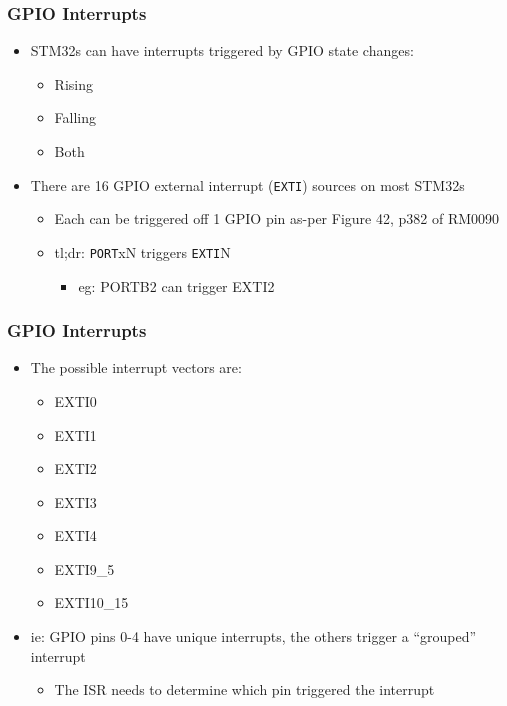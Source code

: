 \documentclass[14pt]{beamer}
\begin{document}
\begin{frame}[fragile]
\frametitle{GPIO Interrupts}
\begin{itemize}
\item STM32s can have interrupts triggered by GPIO state changes:
	\begin{itemize}
		\item Rising
		\item Falling
		\item Both
	\end{itemize}
\item There are 16 GPIO external interrupt (\texttt{EXTI}) sources on most STM32s
	\begin{itemize}
		\item Each can be triggered off 1 GPIO pin as-per Figure 42, p382 of RM0090
		\item tl;dr: \texttt{PORT}xN triggers \texttt{EXTI}N
			\begin{itemize}
				\item eg: PORTB2 can trigger EXTI2
			\end{itemize}
	\end{itemize}
\end{itemize}
\end{frame}

\begin{frame}[fragile]
\frametitle{GPIO Interrupts}
\begin{itemize}
\item The possible interrupt vectors are:
	\begin{itemize}
		\item EXTI0
		\item EXTI1
		\item EXTI2
		\item EXTI3
		\item EXTI4
		\item EXTI9\_5
		\item EXTI10\_15
	\end{itemize}
\item ie: GPIO pins 0-4 have unique interrupts, the others trigger a ``grouped'' interrupt
	\begin{itemize}
		\item The ISR needs to determine which pin triggered the interrupt
	\end{itemize}
\end{itemize}
\end{frame}
\end{document}
